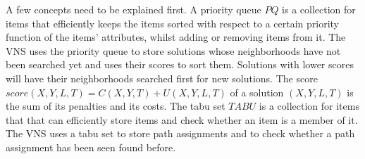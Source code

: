 




%

A few concepts need to be explained first.
A priority queue $PQ$ is a collection for items that efficiently keeps the items sorted with respect to a certain priority function of the items' attributes, whilst adding or removing items from it.
The VNS uses the priority queue to store solutions whose neighborhoods have not been searched yet and uses their scores to sort them.
Solutions with lower scores will have their neighborhoods searched first for new solutions.
The score
$score(X,Y,L,T) = C(X,Y,T) + U(X,Y,L,T)$
of a solution $(X,Y,L,T)$ is the sum of its penalties and its costs.
The tabu set $TABU$ is a collection for items that that can efficiently store items and check whether an item is a member of it.
The VNS uses a tabu set to store path assignments and to check whether a path assignment has been seen found before.  \\

